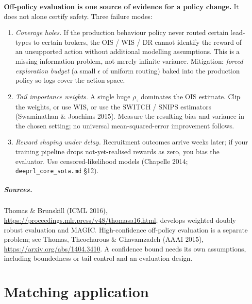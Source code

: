 \documentclass[11pt,oneside]{scrbook}
\begin{document}
\begin{safetyangle}
\textbf{Off-policy evaluation is one source of evidence for a policy change.}
It does not alone certify safety. Three failure modes:

\begin{enumerate}\setlength\itemsep{2pt}
  \item \emph{Coverage holes.} If the production behaviour policy never
        routed certain lead-types to certain brokers, the OIS / WIS / DR
        cannot identify the reward of an unsupported action without additional
        modelling assumptions. This is a missing-information problem, not
        merely infinite variance.
        Mitigation: \emph{forced exploration budget} (a small $\epsilon$ of
        uniform routing) baked into the production policy so logs cover the
        action space.
  \item \emph{Tail importance weights.} A single huge $\rho_\tau$ dominates
        the OIS estimate. Clip the weights, or use WIS, or use the SWITCH
        / SNIPS estimators (Swaminathan \& Joachims 2015). Measure the resulting bias and variance in the chosen setting; no
        universal mean-squared-error improvement follows.
  \item \emph{Reward shaping under delay.} Recruitment outcomes arrive weeks
        later; if your training pipeline drops not-yet-realised rewards as
        zero, you bias the evaluator. Use censored-likelihood models
        (Chapelle 2014; \texttt{deeprl\_core\_sota.md} \S 12).
\end{enumerate}

\paragraph{Sources.}
Thomas \& Brunskill (ICML 2016),
\url{https://proceedings.mlr.press/v48/thomasa16.html}, develops weighted
doubly robust evaluation and MAGIC. High-confidence off-policy evaluation is
a separate problem; see Thomas, Theocharous \& Ghavamzadeh (AAAI 2015),
\url{https://arxiv.org/abs/1404.3410}. A confidence bound needs its own
assumptions, including boundedness or tail control and an evaluation design.

\end{safetyangle}

\chapter{Matching application}
\end{document}
